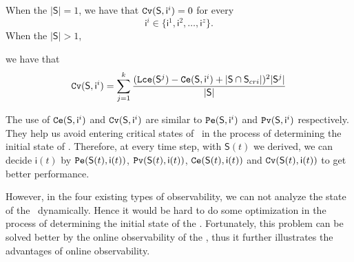 \begin{definition} 
When the $|\mathsf{S}|=1$, we have that
${\tt Cv}(\mathsf{S}, \mathsf{ i}^{i})=0$ for every  \[\mathsf{ i}^{i} \in \{\mathsf{ i}^{1},\mathsf{ i}^{2},\ldots, \mathsf{ i}^{z}\}.\]   When the $|\mathsf{S}|>1$, 

we have that  \\
\begin{equation}
\begin{split}
{\tt Cv}(\mathsf{S}, \mathsf{ i}^{i})=\sum_{j=1}^k\frac{ ({\tt Lce}(\mathsf{S}^{j})-{\tt Ce}(\mathsf{S}, \mathsf{ i}^{i})+|\mathsf{S} \cap \mathsf{S}_{cri}|)^2 |\mathsf{S}^{j}|}{ |\mathsf{S}|}
\end{split}
\end{equation}
\end{definition}

The use of ${\tt Ce}(\mathsf{S}, \mathsf{ i}^{i})$ and ${\tt Cv}(\mathsf{S}, \mathsf{ i}^{i})$ are similar to ${\tt Pe}(\mathsf{S}, \mathsf{ i}^{i})$ and ${\tt Pv}(\mathsf{S}, \mathsf{ i}^{i})$ respectively. They help us avoid entering critical states of \BCNs\ in the process of determining the initial state of \BCNs. Therefore, at every time step, with $\mathsf{S}(t)$ we derived, we can decide $\mathsf{i}(t)$ by $ {\tt Pe}(\mathsf{S}(t), \mathsf{ i}(t))$, ${\tt Pv}(\mathsf{S}(t), \mathsf{ i}(t))$, ${\tt Ce}(\mathsf{S}(t), \mathsf{ i}(t))$ and ${\tt Cv}(\mathsf{S}(t), \mathsf{ i}(t))$ to get better performance.

However, in the four existing types of observability, we can not analyze the state of the \BCNs\ dynamically. Hence it would be hard to do some optimization in the process of determining the initial state of the \BCNs. Fortunately, this problem can be solved better by the online observability of the \BCNs, thus it further illustrates the advantages of online observability.